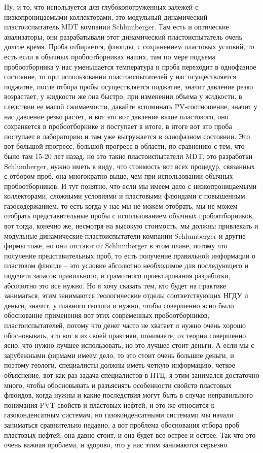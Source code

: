 \documentclass[main.tex]{subfiles}
\begin{document}
Ну, и то, что используется для глубокопогруженных залежей с низкопроницаемыми коллекторами, это модульный динамический пластоиспытатель MDT компании Schlumberger.
Там есть и оптические анализаторы, они разрабатывали этот динамический пластоиспытатель очень долгое время.
Проба отбирается, флюиды, с сохранением пластовых условий, то есть если в обычных пробоотборниках наших, там по мере подъема пробоотборника у нас уменьшается температура и проба переходит в однофазное состояние, то при использовании пластоиспытателей у нас осуществляется поджатие, после отбора пробы осуществляется поджатие, значит давление резко возрастает, у жидкости же она быстро, при изменении объема у жидкости, в следствии ее малой сжимаемости, давайте вспоминать PV-соотношение, значит у нас давление резко растет, и вот это вот давление выше пластового, оно сохраняется в пробоотборнике и поступает в итоге, в итоге вот это проба поступает в лабораторию и там уже выгружается в однофазном состоянии.
Это вот большой прогресс, большой прогресс в области, по сравнению с тем, что было там 15-20 лет назад, но это такие пластоиспытатели MDT, это разработки Schlumberger, нужно иметь в виду, что стоимость вот всех процедур, связанных с отбором проб, она многократно выше, чем при использовании обычных пробоотборников.
И тут понятно, что если мы имеем дело с низкопроницаемыми коллекторами, сложными условиями и пластовыми флюидами с повышенным газосодержанием, то есть когда у нас мы не можем отобрать, мы не можем отобрать представительные пробы с использованием обычных пробоотборников, вот тогда, конечно же, несмотря на высокую стоимость, мы должны привлекать и модульные динамические пластоиспытатели компании Schlumberger и другие фирмы тоже, но они отстают от Schlumberger в этом плане, потому что получение представительных проб, то есть получение правильной информации о пластовом флюиде -- это условие абсолютно необходимое для последующего и подсчета запасов правильного, и грамотного проектирования разработки, абсолютно это все нужно.
Но я хочу сказать тем, кто будет на практике заниматься, этим занимаются геологические отделы соответствующих НГДУ и деньги, значит, у главного геолога и нужно, чтобы совершенно ясно было обоснование применения вот этих современных пробоотборников, пластоиспытателей, потому что денег часто не хватает и нужно очень хорошо обосновывать, это вот я из своей практики, понимаете, из теории совершенно ясно, что нужно лучшее использовать, но это лучшее стоит деньги.
А если мы с зарубежными фирмами имеем дело, то это стоит очень большие деньги, и поэтому геологи, специалисты должны иметь четкую информацию, четкое объяснение, вот как раз задача специалистов в НТЦ, я этим занимался достаточно много, чтобы обосновывать и разъяснять особенности свойств пластовых флюидов, когда нужны и какие последствия могут быть в случае неправильного понимания PVT-свойств и пластовых нефтей, и это же относится к газоконденсатным системам, но газоконденсатными системами мы начали заниматься сравнительно недавно, а вот проблема обоснования отбора проб пластовых нефтей, она давно стоит, и она будет все острее и острее.
Так что это очень важная проблема, и здорово, что у нас этим занимаются серьезно.
\end{document}
